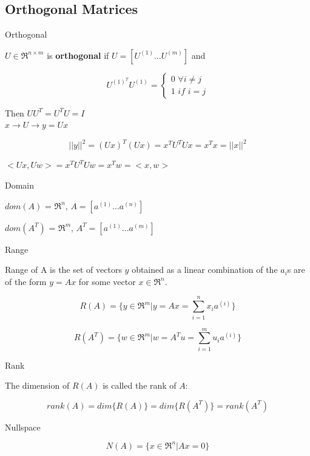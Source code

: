 \subsection{Orthogonal Matrices}

Orthogonal

\begin{definition}
	$U\in \Re^{n\times m}$ is \textbf{orthogonal} if $U = [U^{(1)} ... U^{(m)}]$
	and 
	
	$$ U^{(1)^T}U^{(1)}=\left\{
	\begin{aligned}
	0\,\, \forall i\neq j \\
	1\,\, if \,\, i = j
	\end{aligned}
	\right.
	$$
\end{definition}

Then $UU^T = U^TU = I$\\


$x\rightarrow U \rightarrow y = Ux$

\begin{equation*}
||y||^2 = (Ux)^T(Ux) = x^TU^TUx = x^Tx = ||x||^2
\end{equation*}

$<Ux, Uw> = x^TU^TUw = x^Tw = <x, w>$

Domain

$dom(A)$ = $\Re^n$, $A = [a^{(1)}...a^{(n)}]$

$dom(A^T)$ = $\Re^m$, $A^T = [a^{(1)}...a^{(m)}]$


Range

Range of A is the set of vectors $y$ obtained as a linear combination of the $a_i$s are of the form $y= Ax$ for some vector $x\in \Re^n$.

\begin{equation*}
R(A) = \{y\in \Re^m | y = Ax = \sum^n_{i=1}x_ia^{(i)}\}
\end{equation*}

\begin{equation*}
R(A^T) = \{w\in \Re^m | w = A^Tu = \sum^m_{i=1}u_ia^{(i)}\}
\end{equation*}

Rank

The dimension of $R(A)$ is called the rank of $A$:

\begin{equation*}
rank(A) = dim\{R(A)\} = dim\{R(A^T)\} = rank(A^T)
\end{equation*}

Nullspace

\begin{equation*}
N(A) = \{x\in \Re^n | Ax = 0\}
\end{equation*}

